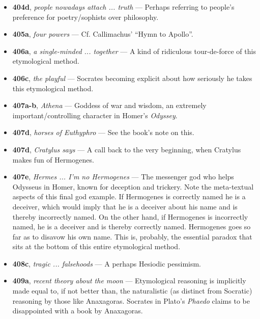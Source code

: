 \documentclass[12pt]{article}
\begin{document}
\begin{itemize}
\item \textbf{404d}, \textit{people nowadays attach ... truth} --- Perhaps referring to people's preference for poetry/sophists over philosophy.

\item \textbf{405a}, \textit{four powers} --- Cf. Callimachus' ``Hymn to Apollo''.

\item \textbf{406a}, \textit{a single-minded ... together} --- A kind of ridiculous tour-de-force of this etymological method.

\item \textbf{406c}, \textit{the playful} --- Socrates becoming explicit about how seriously he takes this etymological method.

\item \textbf{407a-b}, \textit{Athena} --- Goddess of war and wisdom, an extremely important/controlling character in Homer's \textit{Odyssey}. 

\item \textbf{407d}, \textit{horses of Euthyphro} --- See the book's note on this.

\item \textbf{407d}, \textit{Cratylus says} --- A call back to the very beginning, when Cratylus makes fun of Hermogenes.

\item \textbf{407e}, \textit{Hermes ... I'm no Hermogenes} --- The messenger god who helps Odysseus in Homer, known for deception and trickery. Note the meta-textual aspects of this final god example. If Hermogenes is correctly named he is a deceiver, which would imply that he is a deceiver about his name and is thereby incorrectly named. On the other hand, if Hermogenes is incorrectly named, he is a deceiver and is thereby correctly named. Hermogenes goes so far as to disavow his own name. This is, probably, the essential paradox that sits at the bottom of this entire etymological method.

\item \textbf{408c}, \textit{tragic ... falsehoods} --- A perhaps Hesiodic pessimism.

\item \textbf{409a}, \textit{recent theory about the moon} --- Etymological reasoning is implicitly made equal to, if not better than, the naturalistic (as distinct from Socratic) reasoning by those like Anaxagoras. Socrates in Plato's \textit{Phaedo} claims to be disappointed with a book by Anaxagoras.

\end{itemize}
\end{document}
